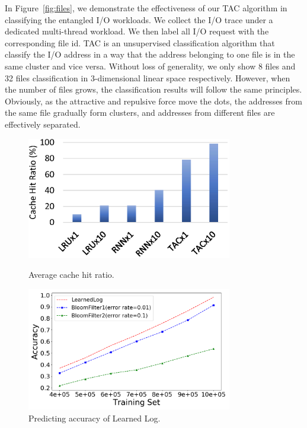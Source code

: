 In Figure~\ref{fig:files}, we demonstrate the effectiveness of our TAC algorithm in classifying the entangled I/O workloads.
We collect the I/O trace under a dedicated multi-thread workload.
We then label all I/O request with the corresponding file id.
TAC is an unsupervised classification algorithm that classify the I/O address
in a way that the address belonging to one file is in the same cluster and vice versa.
Without loss of generality, we only show 8 files and 32 files classification in 3-dimensional linear space respectively.
However, when the number of files grows, the classification results will follow the same principles.
Obviously, as the attractive and repulsive force move the dots, the addresses from the same file gradually form clusters,
and addresses from different files are effectively separated.

\begin{figure}
\centering
\begin{minipage}{.45\textwidth}
  \centering
  \includegraphics[width=0.8\textwidth]{fig/cache.eps}
  \caption{Average cache hit ratio.}
  \label{fig:cache}
\end{minipage}
\begin{minipage}{.45\textwidth}
  \centering
  \includegraphics[width=0.8\textwidth]{fig/log2.png}
  \caption{Predicting accuracy of Learned Log.}
  \label{fig:learned_log}
\end{minipage}%
\end{figure}

